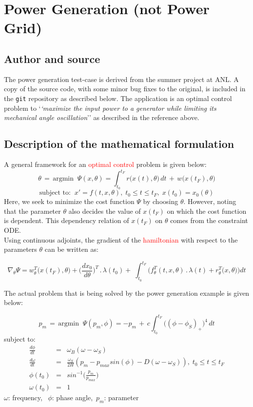\section{Power Generation (not Power Grid)}
\subsection{Author and source}
The power generation test-case is derived from the summer project \cite{Rao_2013} at ANL. A copy of the source code, with some minor bug fixes to the original, is included in the \texttt{git} repository as described below. The application is an optimal control problem to `\textit{`maximize the input power to a generator while limiting its mechanical angle oscillation}'' as described in the reference above.
\subsection{Description of the mathematical formulation}
A general framework for an \textcolor{red}{optimal control} \cite{Sandu_2012} problem is given below:
\[ \theta \,=\, \text{argmin} \;\; \Psi(x, \theta) = \int_{t_0}^{t_F} r\big(x(t), \theta\big)\, dt \,+\, w\big(x(t_F), \theta\big)\]
\[ \text{subject to:} \;\; x' = f(t, x, \theta), \; t_0 \leq t \leq t_F, \; x(t_0) = x_0(\theta) \]
Here, we seek to minimize the cost function $\Psi$ by choosing $\theta$. However, noting that the parameter $\theta$ also decides the value of $x(t_F)$ on which the cost function is dependent. This dependency relation of $x(t_F)$ on $\theta$ comes from the constraint ODE.\\

\noindent Using continuous adjoints, the gradient of the \textcolor{red}{hamiltonian} with respect to the parameters $\theta$ can be written as:

\[\nabla_{\theta} \Psi = w_{\theta}^T\big(x(t_F), \theta\big) + \bigg(\frac{d x_0}{d \theta}\bigg)^T \,.\, \lambda(t_0) +\;\int_{t_0}^{t_F} \bigg(f_{\theta}^T(t, x, \theta) \,.\, \lambda(t) + r_{\theta}^T\big(x,\theta\big)\bigg) dt\]

\noindent The actual problem that is being solved by the power generation example is given below:

\[ p_m \,=\, \text{argmin} \;\; \Psi( p_m, \phi) = - p_m \,+\, c \int_{t_0}^{t_F} \big((\phi - \phi_S)_{+}\big)^4 \, dt\]
subject to: 
\begin{eqnarray*}
\frac{d\phi}{dt} &=& \omega_B (\omega - \omega_S)\\
\frac{d\omega}{dt} &=& \frac{\omega_S}{2H} (p_m - p_{max} sin(\phi) - D(\omega - \omega_S)),\; t_0 \leq t \leq t_F \\
\phi(t_0) &=& sin^{-1}\bigg(\frac{p_m}{p_{max}}\bigg) \\
\omega(t_0) &=& 1 
\end{eqnarray*}
$\omega$: frequency, \, $\phi$: phase angle,\, $p_m$: parameter\\


